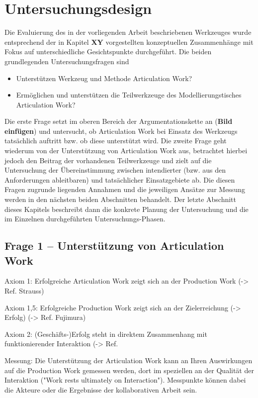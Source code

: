 \chapter{Untersuchungsdesign} %
\label{cha:untersuchungsdesign}

Die Evaluierung des in der vorliegenden Arbeit beschriebenen Werkzeuges wurde entsprechend der in Kapitel \textbf{XY} vorgestellten konzeptuellen Zusammenhänge mit Fokus auf unterschiedliche Gesichtspunkte durchgeführt. Die beiden grundlegenden Untersuchungsfragen sind
\begin{itemize}
	\item Unterstützen Werkzeug und Methode Articulation Work?
	\item Ermöglichen und unterstützen die Teilwerkzeuge des Modellierungstisches Articulation Work?
\end{itemize}
Die erste Frage setzt im oberen Bereich der Argumentationskette an (\textbf{Bild einfügen}) und untersucht, ob Articulation Work bei Einsatz des Werkzeugs tatsächlich auftritt bzw. ob diese unterstützt wird. Die zweite Frage geht wiederum von der Unterstützung von Articulation Work aus, betrachtet hierbei jedoch den Beitrag der vorhandenen Teilwerkzeuge und zielt auf die Untersuchung der Übereinstimmung zwischen intendierter (bzw. aus den Anforderungen ableitbaren) und tatsächlicher Einsatzgebiete ab. Die diesen Fragen zugrunde liegenden Annahmen und die jeweiligen Ansätze zur Messung werden in den nächsten beiden Abschnitten behandelt. Der letzte Abschnitt dieses Kapitels beschreibt dann die konkrete Planung der Untersuchung und die im Einzelnen durchgeführten Untersuchungs-Phasen. 

\section{Frage 1 – Unterstützung von Articulation Work} %
\label{sec:frage_1_unterstützung_von_articulation_work}

Axiom 1:
Erfolgreiche Articulation Work zeigt sich an der Production Work (-> Ref. Strauss)

Axiom 1,5:
Erfolgreiche Production Work zeigt sich an der Zielerreichung (-> Erfolg) (-> Ref. Fujimura)

Axiom 2: 
(Geschäfts-)Erfolg steht in direktem Zusammenhang mit funktionierender Interaktion (-> Ref. 

Messung:
Die Unterstützung der Articulation Work kann an Ihren Auswirkungen auf die Production Work gemessen werden, dort im speziellen an der Qualität der Interaktion ("Work rests ultimately on Interaction"). Messpunkte können dabei die Akteure oder die Ergebnisse der kollaborativen Arbeit sein.

